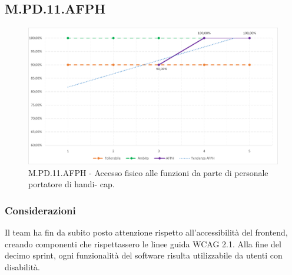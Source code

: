 \documentclass[10pt, a4paper]{article}
\begin{document}
\subsection{M.PD.11.AFPH}
\begin{figure}[H] \includegraphics[width=15.5cm]{img/metriche/MPD11AFPH.png} \caption{M.PD.11.AFPH - Accesso fisico alle funzioni da parte di personale portatore di handi-
cap.} \end{figure}
\subsubsection{Considerazioni}
Il team ha fin da subito posto attenzione rispetto all'accessibilità del frontend, creando componenti che rispettassero le linee guida WCAG 2.1. Alla fine del decimo sprint, ogni funzionalità del software risulta utilizzabile da utenti con disabilità.
\end{document}
